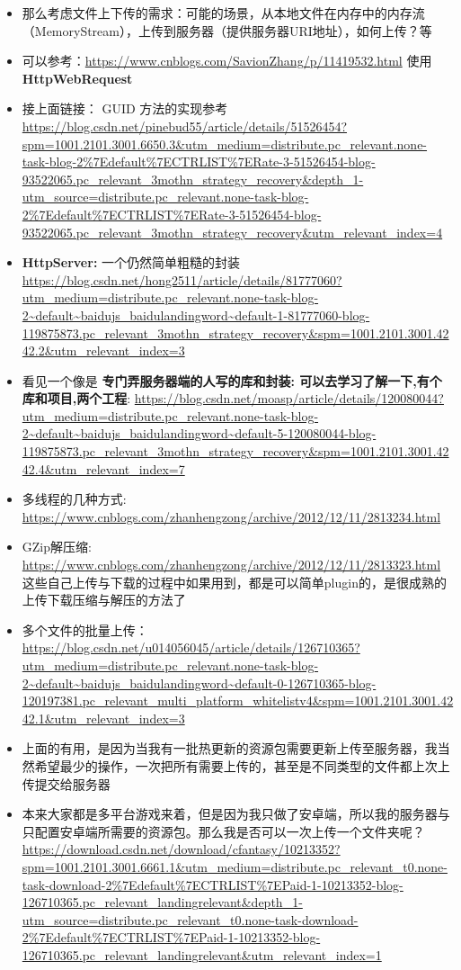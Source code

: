 \documentclass[9pt, b5paper]{article}
\begin{document}
\begin{itemize}
\item 那么考虑文件上下传的需求：可能的场景，从本地文件在内存中的内存流（MemoryStream），上传到服务器（提供服务器URI地址），如何上传？等
\item 可以参考：\url{https://www.cnblogs.com/SavionZhang/p/11419532.html}  使用 \textbf{HttpWebRequest}
\item 接上面链接： GUID  方法的实现参考  \url{https://blog.csdn.net/pinebud55/article/details/51526454?spm=1001.2101.3001.6650.3&utm_medium=distribute.pc_relevant.none-task-blog-2\%7Edefault\%7ECTRLIST\%7ERate-3-51526454-blog-93522065.pc_relevant_3mothn_strategy_recovery&depth_1-utm_source=distribute.pc_relevant.none-task-blog-2\%7Edefault\%7ECTRLIST\%7ERate-3-51526454-blog-93522065.pc_relevant_3mothn_strategy_recovery&utm_relevant_index=4}
\item \textbf{HttpServer:} 一个仍然简单粗糙的封装 \url{https://blog.csdn.net/hong2511/article/details/81777060?utm_medium=distribute.pc_relevant.none-task-blog-2~default~baidujs_baidulandingword~default-1-81777060-blog-119875873.pc_relevant_3mothn_strategy_recovery&spm=1001.2101.3001.4242.2&utm_relevant_index=3}
\item 看见一个像是 \textbf{专门弄服务器端的人写的库和封装: 可以去学习了解一下,有个库和项目,两个工程}:  \url{https://blog.csdn.net/moasp/article/details/120080044?utm_medium=distribute.pc_relevant.none-task-blog-2~default~baidujs_baidulandingword~default-5-120080044-blog-119875873.pc_relevant_3mothn_strategy_recovery&spm=1001.2101.3001.4242.4&utm_relevant_index=7}
\item 多线程的几种方式: \url{https://www.cnblogs.com/zhanhengzong/archive/2012/12/11/2813234.html}
\item GZip解压缩: \url{https://www.cnblogs.com/zhanhengzong/archive/2012/12/11/2813323.html} 这些自己上传与下载的过程中如果用到，都是可以简单plugin的，是很成熟的上传下载压缩与解压的方法了
\item 多个文件的批量上传：\url{https://blog.csdn.net/u014056045/article/details/126710365?utm_medium=distribute.pc_relevant.none-task-blog-2~default~baidujs_baidulandingword~default-0-126710365-blog-120197381.pc_relevant_multi_platform_whitelistv4&spm=1001.2101.3001.4242.1&utm_relevant_index=3}
\item 上面的有用，是因为当我有一批热更新的资源包需要更新上传至服务器，我当然希望最少的操作，一次把所有需要上传的，甚至是不同类型的文件都上次上传提交给服务器
\item 本来大家都是多平台游戏来着，但是因为我只做了安卓端，所以我的服务器与只配置安卓端所需要的资源包。那么我是否可以一次上传一个文件夹呢？\url{https://download.csdn.net/download/cfantasy/10213352?spm=1001.2101.3001.6661.1&utm_medium=distribute.pc_relevant_t0.none-task-download-2\%7Edefault\%7ECTRLIST\%7EPaid-1-10213352-blog-126710365.pc_relevant_landingrelevant&depth_1-utm_source=distribute.pc_relevant_t0.none-task-download-2\%7Edefault\%7ECTRLIST\%7EPaid-1-10213352-blog-126710365.pc_relevant_landingrelevant&utm_relevant_index=1}

\end{itemize}
\end{document}
